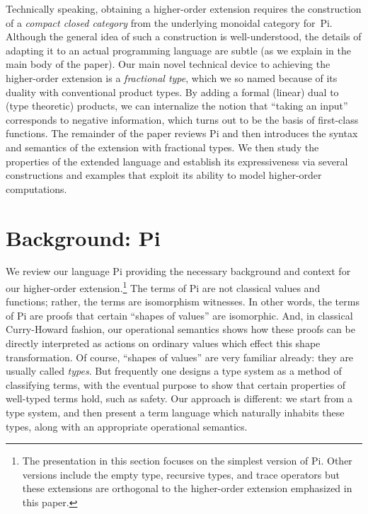 \documentclass{llncs}
\newcommand{\roshan}[1]{\textsc{Roshan says:} 
  \textit{#1}
}
\begin{document}
Technically speaking, obtaining a higher-order extension requires the
construction of a \emph{compact closed category} from the underlying monoidal
category for~{{Pi}}. Although the general idea of such a construction is
well-understood, the details of adapting it to an actual programming language
are subtle (as we explain in the main body of the paper).  Our main novel
technical device to achieving the higher-order extension is a
\emph{fractional type}, which we so named because of its duality with
conventional product types.  By adding a formal (linear) dual to (type
theoretic) products, we can internalize the notion that ``taking an input''
corresponds to negative information, which turns out to be the basis of
first-class functions. The remainder of the paper reviews {{Pi}} and then
introduces the syntax and semantics of the extension with fractional
types. We then study the properties of the extended language and establish
its expressiveness via several constructions and examples that exploit its
ability to model higher-order computations.


\section{Background: {{Pi}} }
\label{sec:pi}

We review our language {{Pi}} providing the necessary background and
context for our higher-order extension.\footnote{The presentation in this
  section focuses on the simplest version of {{Pi}}. Other versions
  include the empty type, recursive types, and trace operators but these
  extensions are orthogonal to the higher-order extension emphasized in this
  paper.} The terms of {{Pi}} are not classical values and functions;
rather, the terms are isomorphism witnesses.  In other words, the terms of
{{Pi}} are proofs that certain ``shapes of values'' are isomorphic.
And, in classical Curry-Howard fashion, our operational semantics shows how
these proofs can be directly interpreted as actions on ordinary values which
effect this shape transformation. Of course, ``shapes of values'' are very
familiar already: they are usually called \emph{types}.  But frequently one
designs a type system as a method of classifying terms, with the eventual
purpose to show that certain properties of well-typed terms hold, such as
safety.  Our approach is different: we start from a type system, and then
present a term language which naturally inhabits these types, along with an
appropriate operational semantics.
\end{document}
